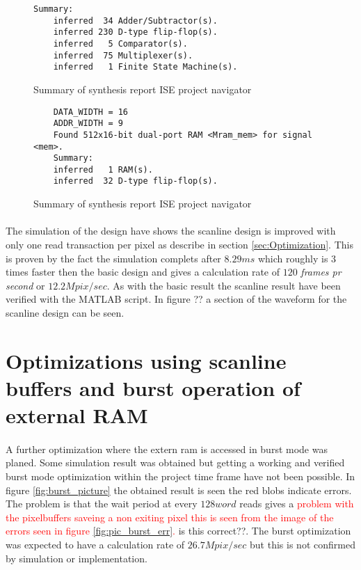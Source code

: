 \begin{figure}[H]
\centering
\begin{BVerbatim}
Summary:
    inferred  34 Adder/Subtractor(s).
    inferred 230 D-type flip-flop(s).
    inferred   5 Comparator(s).
    inferred  75 Multiplexer(s).
    inferred   1 Finite State Machine(s).
\end{BVerbatim}
\caption{Summary of synthesis report ISE project navigator}
\label{fig:sum_synthesis_report_scan}
\end{figure}

\begin{figure}[H]
\centering
\begin{BVerbatim}
    DATA_WIDTH = 16
    ADDR_WIDTH = 9
    Found 512x16-bit dual-port RAM <Mram_mem> for signal <mem>.
    Summary:
	inferred   1 RAM(s).
	inferred  32 D-type flip-flop(s).
\end{BVerbatim}
\caption{Summary of synthesis report ISE project navigator}
\label{fig:sum_synthesis_report_ram}
\end{figure}

\paragraph*{}
The simulation of the design have shows the scanline design is improved with only one read transaction per pixel as describe in section \ref{sec:Optimization}. This is proven by the fact the simulation complets after $8.29ms$ which roughly is 3 times faster then the basic design and gives a calculation rate of $120$ \textit{frames pr second} or $12.2Mpix/sec$. As with the basic result the scanline result have been verified with the MATLAB script. In figure ?? a section of the waveform  for the scanline design can be seen.

\section{Optimizations using scanline buffers and burst operation of external RAM}
\paragraph*{}
A further optimization where the extern ram is accessed in burst mode was planed. Some simulation result was obtained but getting a working and verified burst mode optimization within the project time frame have not been possible. In figure \ref{fig:burst_picture} the obtained result is seen the red blobs indicate errors. The problem is that the wait period at every $128word$ reads gives a \textcolor{red}{problem with the pixelbuffers saveing a non exiting pixel this is seen from the image of the errors seen in figure \ref{fig:pic_burst_err}.} is this correct??. The burst optimization was expected to have a calculation rate of $26.7Mpix/sec$ but this is not confirmed by simulation or implementation.
     
